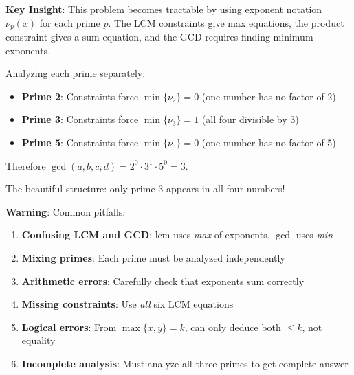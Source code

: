 \documentclass[12pt]{article}
\begin{document}
\begin{keyinsightbox}
\textbf{Key Insight}: This problem becomes tractable by using exponent notation $\nu_p(x)$ for each prime $p$. The LCM constraints give max equations, the product constraint gives a sum equation, and the GCD requires finding minimum exponents.

Analyzing each prime separately:
\begin{itemize}
    \item \textbf{Prime 2}: Constraints force $\min\{\nu_2\} = 0$ (one number has no factor of 2)
    \item \textbf{Prime 3}: Constraints force $\min\{\nu_3\} = 1$ (all four divisible by 3)
    \item \textbf{Prime 5}: Constraints force $\min\{\nu_5\} = 0$ (one number has no factor of 5)
\end{itemize}

Therefore $\gcd(a,b,c,d) = 2^0 \cdot 3^1 \cdot 5^0 = 3$.

The beautiful structure: only prime 3 appears in all four numbers!
\end{keyinsightbox}

\begin{warningbox}
\textbf{Warning}: Common pitfalls:
\begin{enumerate}
    \item \textbf{Confusing LCM and GCD}: $\text{lcm}$ uses \textit{max} of exponents, $\gcd$ uses \textit{min}
    \item \textbf{Mixing primes}: Each prime must be analyzed independently
    \item \textbf{Arithmetic errors}: Carefully check that exponents sum correctly
    \item \textbf{Missing constraints}: Use \textit{all} six LCM equations
    \item \textbf{Logical errors}: From $\max\{x,y\} = k$, can only deduce both $\leq k$, not equality
    \item \textbf{Incomplete analysis}: Must analyze all three primes to get complete answer
\end{enumerate}
\end{warningbox}
\end{document}
